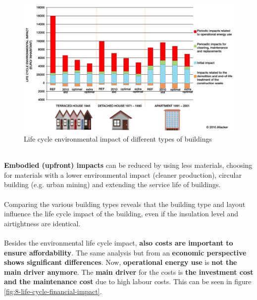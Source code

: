 \documentclass[../summary.tex]{subfiles}
\begin{document}
	\begin{figure}[H]
		\centering
		\includegraphics[width=0.8\linewidth]{../images/8-life-cycle-environmental-impact}
		\caption{Life cycle environmental impact of different types of buildings}
		\label{fig:8-life-cycle-environmental-impact}
	\end{figure}
	\ \\
	\textbf{Embodied (upfront) impacts }can be reduced by using less materials, choosing for materials with a lower environmental impact (cleaner production), circular building (e.g. urban mining) and extending the service life of buildings.\\
	\\
	Comparing the various building types reveals that the building type and layout influence the life cycle impact of the building, even if the insulation level and airtightness are identical.\\
	\\
	Besides the environmental life cycle impact, \textbf{also costs are important to ensure affordability}. The same analysis but from an \textbf{economic perspective shows significant differences}. Now, \textbf{operational energy use} is \textbf{not the main driver anymore}.
	The \textbf{main driver} for the costs is \textbf{the investment cost and the maintenance cost} due to high labour costs. This can be seen in figure \ref{fig:8-life-cycle-financial-impact}.
	
\end{document}
